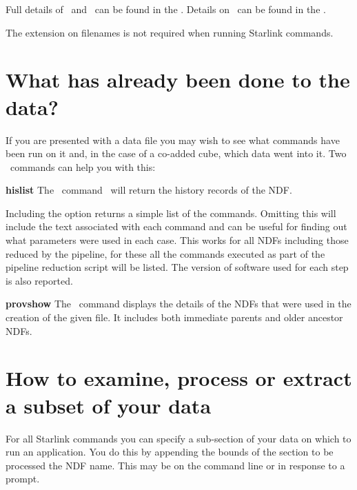 \documentclass[11pt,oneside,chapters]{starlink}
\begin{document}
Full details of \ndftrace\ and \fitslist\ can be found in the
. Details on \HDSTRACE\ can be
found in the .

\begin{tip}
The  extension on filenames is not required when running Starlink commands.
\end{tip}


\section{What has already been done to the data?}

If you are presented with a data file you may wish to see what
commands have been run on it and, in the case of a co-added cube, which
data went into it. Two \Kappa\ commands can help you with this:
\vspace{0.7cm}\\
\begin{aligndesc}
\item[\textbf{hislist}]
The \Kappa\ command \hislist\ will return the history records of the NDF.
\begin{terminalv}
\end{terminalv}
Including the  option returns a simple list of the
commands. Omitting this will include the text associated with each
command and can be useful for finding out what parameters were used in
each case. This works for all NDFs including those reduced by the
pipeline, for these all the commands executed as part of the pipeline
reduction script will be listed. The version of software used for each
step is also reported.

\item[\textbf{provshow}]
The \Kappa\ command  displays the details of the NDFs
that were used in the creation of the given file. It includes both
immediate parents and older ancestor NDFs.
\begin{terminalv}
\end{terminalv}
\end{aligndesc}

\section{How to examine, process or extract a subset of your data}
\label{sec:ndfsections}

For all Starlink commands you can specify a sub-section of your data
on which to run an application. You do this by appending the bounds of
the section to be processed the NDF name. This may be on the command
line or in response to a prompt.
\end{document}
